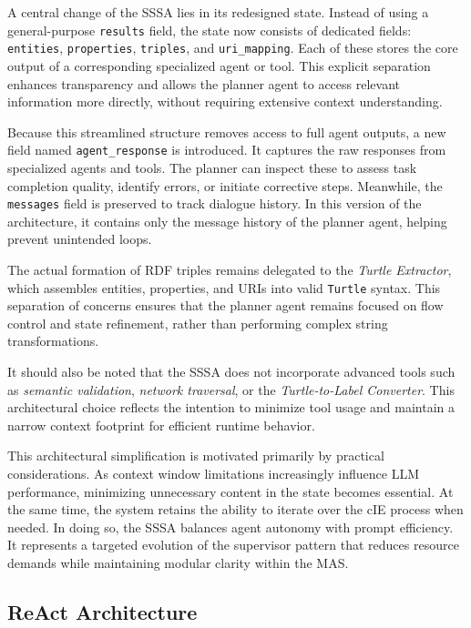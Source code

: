 \documentclass[a4paper,oneside,bibliography=totoc]{scrbook}
\begin{document}
A central change of the \ac{SSSA} lies in its redesigned state. Instead of using a general-purpose \texttt{results} field, the state now consists of dedicated fields: \texttt{entities}, \texttt{properties}, \texttt{triples}, and \texttt{uri\_mapping}. Each of these stores the core output of a corresponding specialized agent or tool. This explicit separation enhances transparency and allows the planner agent to access relevant information more directly, without requiring extensive context understanding.

Because this streamlined structure removes access to full agent outputs, a new field named \texttt{agent\_response} is introduced. It captures the raw responses from specialized agents and tools. The planner can inspect these to assess task completion quality, identify errors, or initiate corrective steps. Meanwhile, the \texttt{messages} field is preserved to track dialogue history. In this version of the architecture, it contains only the message history of the planner agent, helping prevent unintended loops.

The actual formation of RDF triples remains delegated to the \textit{Turtle Extractor}, which assembles entities, properties, and URIs into valid \texttt{Turtle} syntax. This separation of concerns ensures that the planner agent remains focused on flow control and state refinement, rather than performing complex string transformations.

It should also be noted that the \ac{SSSA} does not incorporate advanced tools such as \textit{semantic validation}, \textit{network traversal}, or the \textit{Turtle-to-Label Converter}. This architectural choice reflects the intention to minimize tool usage and maintain a narrow context footprint for efficient runtime behavior.

This architectural simplification is motivated primarily by practical considerations. As context window limitations increasingly influence \ac{LLM} performance, minimizing unnecessary content in the state becomes essential. At the same time, the system retains the ability to iterate over the \ac{cIE} process when needed. In doing so, the \ac{SSSA} balances agent autonomy with prompt efficiency. It represents a targeted evolution of the supervisor pattern that reduces resource demands while maintaining modular clarity within the \ac{MAS}.

\subsection{ReAct Architecture}
\label{subsec:react}
\end{document}
